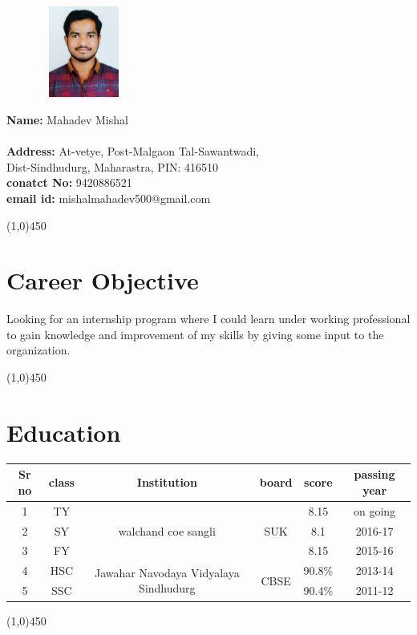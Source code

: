 \documentclass[10pt]{article}
\begin{document}
		\graphicspath{{photos/}}
	\begin{figure}
		\vspace{-20pt}
		\includegraphics[width=3cm,height=3cm]{photo.jpg}
	\end{figure}
\textbf{Name:} Mahadev Mishal\\\\
\textbf{Address:} At-vetye, Post-Malgaon Tal-Sawantwadi,\\
Dist-Sindhudurg, Maharastra, PIN: 416510\\
\textbf{conatct No:} 9420886521\\
\textbf{email id:} mishalmahadev500@gmail.com

\begin{center}
	\line(1,0){450}
\end{center}

\section{Career Objective}
Looking for an internship program where I could learn under working professional to gain knowledge and improvement of my skills by giving some input to the organization.

\begin{center}
	\line(1,0){450}
\end{center}

\section{Education}
\begin{tabular}{||c|c|c|c|c|c||}
	\hline
	Sr no & class & Institution & board & score&passing year \\
	\hline
	1 &TY& \multirow{3}{*}{ walchand coe sangli} & \multirow{3}{*}{ SUK} & 8.15&on going\\
	2 &SY& && 8.1&2016-17\\ 
	3 &FY& && 8.15&2015-16\\\hline 
	4 &HSC&\multirow{2}{*}{Jawahar Navodaya Vidyalaya Sindhudurg} & \multirow{2}{*}{CBSE}&90.8\%&2013-14\\ 
	5 &SSC& &&90.4\%&2011-12\\
	\hline
\end{tabular}
\begin{center}
	\line(1,0){450}
\end{center}
\end{document}
